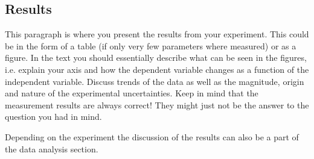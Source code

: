 \subsection{Results}

This paragraph is where you present the results from your
experiment. This could be in the form of a table (if only very few
parameters where measured) or as a figure. In the text you should
essentially describe what can be seen in the figures, i.e. explain
your axis and how the dependent variable changes as a function of
the independent variable. Discuss trends of the data as well as the
magnitude, origin and nature of the experimental uncertainties. Keep
in mind that the measurement results are always correct! They might
just not be the answer to the question you had in mind.

Depending on the experiment the discussion of the results can
also be a part of the data analysis section.